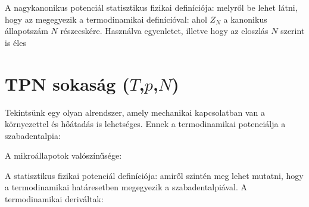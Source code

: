    A nagykanonikus potenciál statisztikus fizikai definíciója:
   melyről be lehet látni, hogy az megegyezik a termodinamikai definícióval:
   ahol $Z_N$ a kanonikus állapotszám $N$ részecskére. Használva  egyenletet, illetve hogy az eloszlás $N$ szerint is éles
   
 \section{TPN sokaság ($T$,$p$,$N$)}
  
  Tekintsünk egy olyan alrendszer, amely mechanikai kapcsolatban van a környezettel és hőátadás is lehetséges. Ennek a termodinamikai potenciálja a szabadentalpia:
  
  A mikroállapotok valószínűsége:
  
  A statisztikus fizikai potenciál definíciója:
  amiről szintén meg lehet mutatni, hogy a termodinamikai határesetben megegyezik a szabadentalpiával. A termodinamikai deriváltak:
  
  
  
  